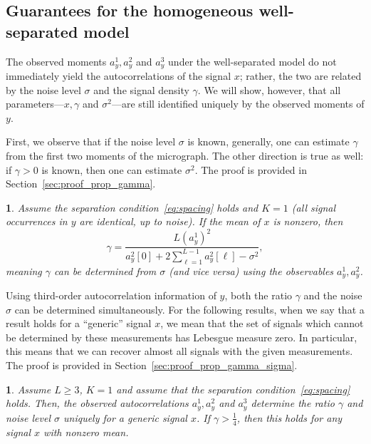 \documentclass[12pt]{article}
\newcommand{\1}{\mathbf{1}}
\theoremstyle{plain}
\theoremstyle{definition}
\theoremstyle{remark}
\theoremstyle{plain}
\theoremstyle{remark}
\theoremstyle{plain}
\theoremstyle{plain}
\theoremstyle{plain}
\newtheorem{proposition}[thm]{\protect\propositionname}
\providecommand{\propositionname}{Proposition}
\numberwithin{equation}{section}
\begin{document}
\subsection{Guarantees for the homogeneous well-separated model} \label{sec:theory_homogeneous_well_separated}
 
The observed moments $a_y^1,a_y^2$ and $a_y^3$ under the well-separated model do not immediately yield the autocorrelations  of the signal $x$; rather, the two are related by the noise level $\sigma$ and the signal density $\gamma$. We will show, however, that all parameters---$x, \gamma$ and $\sigma^2$---are still identified uniquely by the observed moments of $y$.

First, we observe that if  the noise level $\sigma$ is known, generally, one can estimate $\gamma$ from the first two moments of the micrograph.
The other direction is true as well: if $\gamma>0$ is known, then one can estimate $\sigma^2$.
 The proof is provided in Section~\ref{sec:proof_prop_gamma}.

\begin{proposition} \label{prop:gamma}
	Assume the separation condition~\eqref{eq:spacing} holds and $K=1$ (all signal occurrences in $y$ are identical, up to noise). If the mean of $x$ is nonzero, then  
	\begin{equation}
	\gamma  = \frac{L (a^1_y)^2}{a_y^2[0] + 2\sum_{\ell = 1}^{L-1}a_y^2[\ell]-\sigma^2},
	\end{equation}
	meaning $\gamma$ can be determined from $\sigma$ (and vice versa) using the observables $a_y^1, a_y^2$.
\end{proposition}

Using third-order autocorrelation information of $y$, both the ratio $\gamma$ and the noise $\sigma$ can be determined simultaneously. For the following results, when we say that a result holds for a ``generic'' signal $x$, we mean that the set of signals which cannot be determined by these measurements
has Lebesgue measure zero. 
In particular, this means that we can recover
almost all signals with the given measurements. The proof is provided in Section~\ref{sec:proof_prop_gamma_sigma}.

\begin{proposition} \label{prop:gamma_sigma}
	Assume $L \geq 3$, $K=1$ and assume that the separation condition~\eqref{eq:spacing} holds. 
	Then, the observed autocorrelations $a_y^1,a_y^2$ and  $a_y^3$ determine the ratio $\gamma$ and noise level $\sigma$ uniquely for a generic signal $x$. If $\gamma > \frac{1}{4}$, then this holds for any signal $x$ with nonzero mean. 
\end{proposition}
\end{document}
